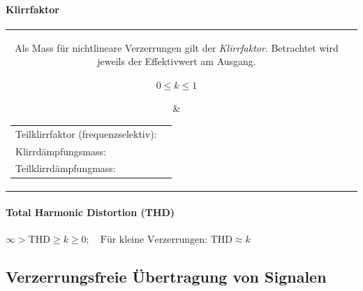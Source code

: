 			\paragraph{Klirrfaktor }
				\begin{tabularx}{\textwidth}{cX}
					\parbox{9cm}{
						Als Mass für nichtlineare Verzerrungen gilt der \textit{Klirrfaktor}. Betrachtet wird jeweils der Effektivwert am Ausgang.
						\begin{center}
							 $ 0 \leq k \leq 1$ 
						\end{center}
					}
						&	\parbox{9cm}{
						\begin{tabular}{ll}
							Teilklirrfaktor (frequenzselektiv):
						&	\fbox{$k_m =  \frac {U_m} {\sqrt{ U_1^2+ U_2^2 + \ldots + U_n^2} }$}
						\\
							Klirrdämpfungsmass:
						& 	\fbox{$a_k = 20 \log \left( \frac1k \right)$}
						\\
							Teilklirrdämpfungmass:
						& 	\fbox{$a_k = 20 \log \left( \frac{1}{k_m} \right)$}
						\end{tabular}
					}
				\end{tabularx}
			
			\paragraph{Total Harmonic Distortion (THD) }
				\begin{center}
					$\infty > \text{THD} \geq k \geq 0; \quad \text{Für kleine Verzerrungen: THD} \approx k $
				\end{center}

		\subsection{Verzerrungsfreie Übertragung von Signalen }
		
